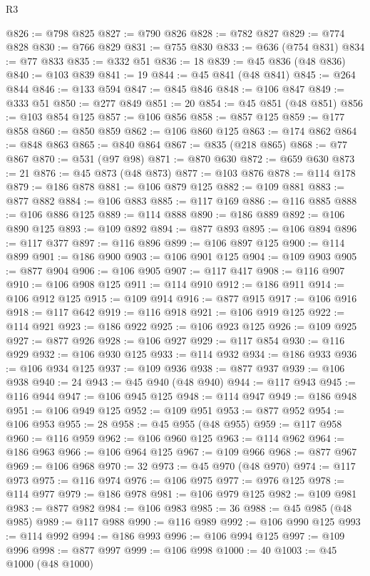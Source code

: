 \begin{lexlean}{R3}
\begin{coremodule}
@826 := @798 @825
@827 := @790 @826
@828 := @782 @827
@829 := @774 @828
@830 := @766 @829
@831 := @755 @830
@833 := @636 (@754 @831)
@834 := @77 @833
@835 := @332 @51
@836 := 18
@839 := @45 @836 (@48 @836)
@840 := @103 @839
@841 := 19
@844 := @45 @841 (@48 @841)
@845 := @264 @844
@846 := @133 @594
@847 := @845 @846
@848 := @106 @847
@849 := @333 @51
@850 := @277 @849
@851 := 20
@854 := @45 @851 (@48 @851)
@856 := @103 @854 @125
@857 := @106 @856
@858 := @857 @125
@859 := @177 @858
@860 := @850 @859
@862 := @106 @860 @125
@863 := @174 @862
@864 := @848 @863
@865 := @840 @864
@867 := @835 (@218 @865)
@868 := @77 @867
@870 := @531 (@97 @98)
@871 := @870 @630
@872 := @659 @630
@873 := 21
@876 := @45 @873 (@48 @873)
@877 := @103 @876
@878 := @114 @178
@879 := @186 @878
@881 := @106 @879 @125
@882 := @109 @881
@883 := @877 @882
@884 := @106 @883
@885 := @117 @169
@886 := @116 @885
@888 := @106 @886 @125
@889 := @114 @888
@890 := @186 @889
@892 := @106 @890 @125
@893 := @109 @892
@894 := @877 @893
@895 := @106 @894
@896 := @117 @377
@897 := @116 @896
@899 := @106 @897 @125
@900 := @114 @899
@901 := @186 @900
@903 := @106 @901 @125
@904 := @109 @903
@905 := @877 @904
@906 := @106 @905
@907 := @117 @417
@908 := @116 @907
@910 := @106 @908 @125
@911 := @114 @910
@912 := @186 @911
@914 := @106 @912 @125
@915 := @109 @914
@916 := @877 @915
@917 := @106 @916
@918 := @117 @642
@919 := @116 @918
@921 := @106 @919 @125
@922 := @114 @921
@923 := @186 @922
@925 := @106 @923 @125
@926 := @109 @925
@927 := @877 @926
@928 := @106 @927
@929 := @117 @854
@930 := @116 @929
@932 := @106 @930 @125
@933 := @114 @932
@934 := @186 @933
@936 := @106 @934 @125
@937 := @109 @936
@938 := @877 @937
@939 := @106 @938
@940 := 24
@943 := @45 @940 (@48 @940)
@944 := @117 @943
@945 := @116 @944
@947 := @106 @945 @125
@948 := @114 @947
@949 := @186 @948
@951 := @106 @949 @125
@952 := @109 @951
@953 := @877 @952
@954 := @106 @953
@955 := 28
@958 := @45 @955 (@48 @955)
@959 := @117 @958
@960 := @116 @959
@962 := @106 @960 @125
@963 := @114 @962
@964 := @186 @963
@966 := @106 @964 @125
@967 := @109 @966
@968 := @877 @967
@969 := @106 @968
@970 := 32
@973 := @45 @970 (@48 @970)
@974 := @117 @973
@975 := @116 @974
@976 := @106 @975
@977 := @976 @125
@978 := @114 @977
@979 := @186 @978
@981 := @106 @979 @125
@982 := @109 @981
@983 := @877 @982
@984 := @106 @983
@985 := 36
@988 := @45 @985 (@48 @985)
@989 := @117 @988
@990 := @116 @989
@992 := @106 @990 @125
@993 := @114 @992
@994 := @186 @993
@996 := @106 @994 @125
@997 := @109 @996
@998 := @877 @997
@999 := @106 @998
@1000 := 40
@1003 := @45 @1000 (@48 @1000)

\end{coremodule}
\end{lexlean}
